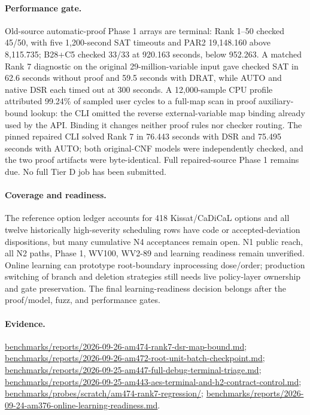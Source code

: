 \documentclass[11pt]{article}
\begin{document}
\paragraph{Performance gate.}
Old-source automatic-proof Phase 1 arrays are terminal: Rank 1--50 checked 45/50, with five 1,200-second SAT timeouts and PAR2 19,148.160 above 8,115.735; B28+C5 checked 33/33 at 920.163 seconds, below 952.263. A matched Rank 7 diagnostic on the original 29-million-variable input gave checked SAT in 62.6 seconds without proof and 59.5 seconds with DRAT, while AUTO and native DSR each timed out at 300 seconds. A 12,000-sample CPU profile attributed 99.24\% of sampled user cycles to a full-map scan in proof auxiliary-bound lookup: the CLI omitted the reverse external-variable map binding already used by the API. Binding it changes neither proof rules nor checker routing. The pinned repaired CLI solved Rank 7 in 76.443 seconds with DSR and 75.495 seconds with AUTO; both original-CNF models were independently checked, and the two proof artifacts were byte-identical. Full repaired-source Phase 1 remains due. No full Tier D job has been submitted.

\paragraph{Coverage and readiness.}
The reference option ledger accounts for 418 Kissat/CaDiCaL options and all twelve historically high-severity scheduling rows have code or accepted-deviation dispositions, but many cumulative N4 acceptances remain open. N1 public reach, all N2 paths, Phase 1, WV100, WV2-89 and learning readiness remain unverified. Online learning can prototype root-boundary inprocessing dose/order; production switching of branch and deletion strategies still needs live policy-layer ownership and gate preservation. The final learning-readiness decision belongs after the proof/model, fuzz, and performance gates.

\paragraph{Evidence.}
\url{benchmarks/reports/2026-09-26-am474-rank7-dsr-map-bound.md};\newline
\url{benchmarks/reports/2026-09-26-am472-root-unit-batch-checkpoint.md};
\url{benchmarks/reports/2026-09-25-am447-full-debug-terminal-triage.md};
\url{benchmarks/reports/2026-09-25-am443-aes-terminal-and-h2-contract-control.md};
\url{benchmarks/probes/scratch/am474-rank7-regression/};
\url{benchmarks/reports/2026-09-24-am376-online-learning-readiness.md}.
\end{document}
